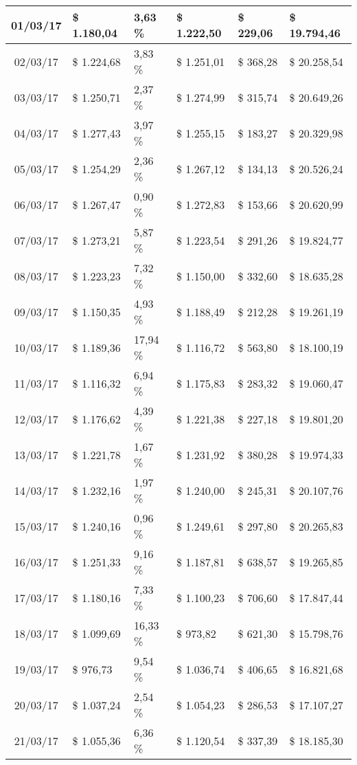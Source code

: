 \begin{small}
\begin{longtable}{|c|l|l|l|l|l|}
01/03/17 & \$ 1.180,04 & 3,63 \% & \$ 1.222,50 & \$ 229,06 & \$ 19.794,46 \\ \hline
02/03/17 & \$ 1.224,68 & 3,83 \% & \$ 1.251,01 & \$ 368,28 & \$ 20.258,54 \\ \hline
03/03/17 & \$ 1.250,71 & 2,37 \% & \$ 1.274,99 & \$ 315,74 & \$ 20.649,26 \\ \hline
04/03/17 & \$ 1.277,43 & 3,97 \% & \$ 1.255,15 & \$ 183,27 & \$ 20.329,98 \\ \hline
05/03/17 & \$ 1.254,29 & 2,36 \% & \$ 1.267,12 & \$ 134,13 & \$ 20.526,24 \\ \hline
06/03/17 & \$ 1.267,47 & 0,90 \% & \$ 1.272,83 & \$ 153,66 & \$ 20.620,99 \\ \hline
07/03/17 & \$ 1.273,21 & 5,87 \% & \$ 1.223,54 & \$ 291,26 & \$ 19.824,77 \\ \hline
08/03/17 & \$ 1.223,23 & 7,32 \% & \$ 1.150,00 & \$ 332,60 & \$ 18.635,28 \\ \hline
09/03/17 & \$ 1.150,35 & 4,93 \% & \$ 1.188,49 & \$ 212,28 & \$ 19.261,19 \\ \hline
10/03/17 & \$ 1.189,36 & 17,94 \% & \$ 1.116,72 & \$ 563,80 & \$ 18.100,19 \\ \hline
11/03/17 & \$ 1.116,32 & 6,94 \% & \$ 1.175,83 & \$ 283,32 & \$ 19.060,47 \\ \hline
12/03/17 & \$ 1.176,62 & 4,39 \% & \$ 1.221,38 & \$ 227,18 & \$ 19.801,20 \\ \hline
13/03/17 & \$ 1.221,78 & 1,67 \% & \$ 1.231,92 & \$ 380,28 & \$ 19.974,33 \\ \hline
14/03/17 & \$ 1.232,16 & 1,97 \% & \$ 1.240,00 & \$ 245,31 & \$ 20.107,76 \\ \hline
15/03/17 & \$ 1.240,16 & 0,96 \% & \$ 1.249,61 & \$ 297,80 & \$ 20.265,83 \\ \hline
16/03/17 & \$ 1.251,33 & 9,16 \% & \$ 1.187,81 & \$ 638,57 & \$ 19.265,85 \\ \hline
17/03/17 & \$ 1.180,16 & 7,33 \% & \$ 1.100,23 & \$ 706,60 & \$ 17.847,44 \\ \hline
18/03/17 & \$ 1.099,69 & 16,33 \% & \$ 973,82 & \$ 621,30 & \$ 15.798,76 \\ \hline
19/03/17 & \$ 976,73 & 9,54 \% & \$ 1.036,74 & \$ 406,65 & \$ 16.821,68 \\ \hline
20/03/17 & \$ 1.037,24 & 2,54 \% & \$ 1.054,23 & \$ 286,53 & \$ 17.107,27 \\ \hline
21/03/17 & \$ 1.055,36 & 6,36 \% & \$ 1.120,54 & \$ 337,39 & \$ 18.185,30 \\ \hline

\end{longtable}
\end{small}
